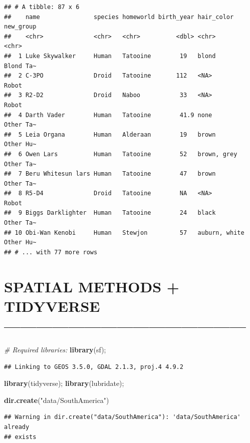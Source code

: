 \documentclass[]{article}
\newenvironment{Shaded}{\begin{snugshade}}{\end{snugshade}}
\newcommand{\CommentTok}[1]{\textcolor[rgb]{0.56,0.35,0.01}{\textit{#1}}}
\newcommand{\KeywordTok}[1]{\textcolor[rgb]{0.13,0.29,0.53}{\textbf{#1}}}
\newcommand{\NormalTok}[1]{#1}
\newcommand{\StringTok}[1]{\textcolor[rgb]{0.31,0.60,0.02}{#1}}
\begin{document}
\begin{verbatim}
## # A tibble: 87 x 6
##    name               species homeworld birth_year hair_color    new_group
##    <chr>              <chr>   <chr>          <dbl> <chr>         <chr>    
##  1 Luke Skywalker     Human   Tatooine        19   blond         Blond Ta~
##  2 C-3PO              Droid   Tatooine       112   <NA>          Robot    
##  3 R2-D2              Droid   Naboo           33   <NA>          Robot    
##  4 Darth Vader        Human   Tatooine        41.9 none          Other Ta~
##  5 Leia Organa        Human   Alderaan        19   brown         Other Hu~
##  6 Owen Lars          Human   Tatooine        52   brown, grey   Other Ta~
##  7 Beru Whitesun lars Human   Tatooine        47   brown         Other Ta~
##  8 R5-D4              Droid   Tatooine        NA   <NA>          Robot    
##  9 Biggs Darklighter  Human   Tatooine        24   black         Other Ta~
## 10 Obi-Wan Kenobi     Human   Stewjon         57   auburn, white Other Hu~
## # ... with 77 more rows
\end{verbatim}

\hypertarget{spatial-methods-tidyverse}{%
\section{SPATIAL METHODS + TIDYVERSE
---------------------------------------------}\label{spatial-methods-tidyverse}}

\begin{Shaded}
\begin{Highlighting}[]
\CommentTok{# Required libraries: }
\KeywordTok{library}\NormalTok{(sf); }
\end{Highlighting}
\end{Shaded}

\begin{verbatim}
## Linking to GEOS 3.5.0, GDAL 2.1.3, proj.4 4.9.2
\end{verbatim}

\begin{Shaded}
\begin{Highlighting}[]
\KeywordTok{library}\NormalTok{(tidyverse); }
\KeywordTok{library}\NormalTok{(lubridate); }

\KeywordTok{dir.create}\NormalTok{(}\StringTok{"data/SouthAmerica"}\NormalTok{)}
\end{Highlighting}
\end{Shaded}

\begin{verbatim}
## Warning in dir.create("data/SouthAmerica"): 'data/SouthAmerica' already
## exists
\end{verbatim}
\end{document}
